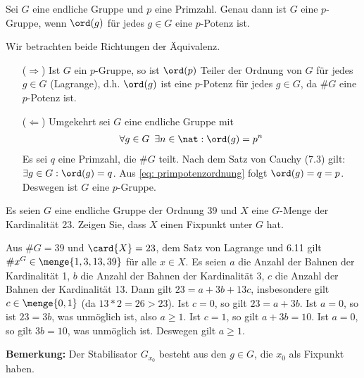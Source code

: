 \begin{uebungsblatt}
%
\begin{uebung}[Präsenz]
	Sei $G$ eine endliche Gruppe und $p$ eine Primzahl. Genau dann ist $G$ eine $p$-Gruppe, wenn $\ord(g)$ für jedes $g \in G$ eine $p$-Potenz ist.
\end{uebung}
\begin{loesung}
	Wir betrachten beide Richtungen der Äquivalenz.
	\begin{itemize}
		\item[($\Rightarrow$)] Ist $G$ ein $p$-Gruppe, so ist $\ord(p)$ Teiler der Ordnung von $G$ für jedes $g \in G$ (Lagrange), d.h. $\ord(g)$ ist eine $p$-Potenz für jedes $g \in G$, da $\# G$ eine $p$-Potenz ist.
		\item [($\Leftarrow$)] Umgekehrt sei $G$ eine endliche Gruppe mit 
		\begin{align} \label{eq: primpotenzordnung}
			\forall g \in G \enspace \exists n \in \nat: \ord(g) = p^n
		\end{align}
		Es sei $q$ eine Primzahl, die $\# G$ teilt. Nach dem Satz von Cauchy (7.3) gilt: $\exists g \in G : \ord(g) = q$. Aus \cref{eq: primpotenzordnung} folgt $\ord(g) = q = p$. Deswegen ist $G$ eine $p$-Gruppe.
	\end{itemize}
\end{loesung}
%
\begin{uebung}[Präsenz]
	Es seien $G$ eine endliche Gruppe der Ordnung 39 und $X$ eine $G$-Menge der Kardinalität 23. Zeigen Sie, dass $X$ einen Fixpunkt unter $G$ hat.
\end{uebung}
\begin{loesung}
	Aus $\#G =39$ und $\card{X} = 23$, dem Satz von Lagrange und 6.11 gilt $\# x^G \in \menge{1,3,13,39}$ für alle $x \in X$. Es seien $a$ die Anzahl der Bahnen der Kardinalität 1, $b$ die Anzahl der Bahnen der Kardinalität 3, $c$ die Anzahl der Bahnen der Kardinalität 13. Dann gilt $23 = a + 3b + 13c$, insbesondere gilt $c \in \menge{0,1}$ (da $13*2 =26 > 23$). Ist $c=0$, so gilt $23=a+3b$. Ist $a=0$, so ist $23 = 3b$, was unmöglich ist, also $a \geq 1$. Ist $c=1$, so gilt $a+3b=10$. Ist $a=0$, so gilt $3b=10$, was unmöglich ist. Deswegen gilt $a \geq 1$.
\end{loesung}

\textbf{Bemerkung:} Der Stabilisator $G_{x_0}$ besteht aus den $g \in G$, die $x_0$ als Fixpunkt haben.

\end{uebungsblatt}